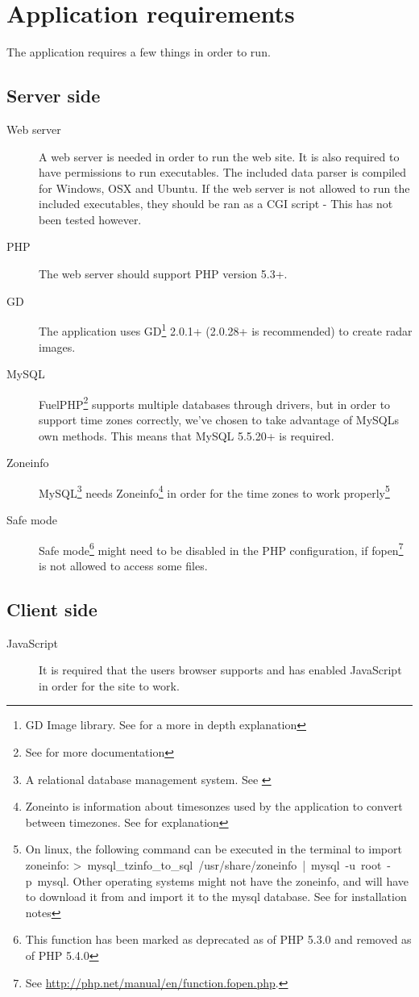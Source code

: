 \chapter{Application requirements}
\label{sec:application_requirements}
The application requires a few things in order to run.

\section{Server side}
\begin{description}
\item[Web server] A web server is needed in order to run the web site. It is also required to have permissions to run executables. The included data parser is compiled for Windows, OSX and Ubuntu. If the web server is not allowed to run the included executables, they should be ran as a CGI script - This has not been tested however.
\item[PHP] The web server should support PHP version 5.3+.
\item[GD] The application uses GD\footnote{GD Image library. See \cite{GD} for a more in depth explanation} 2.0.1+ (2.0.28+ is recommended) to create radar images.
\item[MySQL] FuelPHP\footnote{See \cite{FuelPHP} for more documentation} supports multiple databases through drivers, but in order to support time zones correctly, we've chosen to take advantage of MySQLs own methods. This means that MySQL 5.5.20+ is required.
\item[Zoneinfo] MySQL\footnote{A relational database management system. See \cite{MySQL}} needs Zoneinfo\footnote{Zoneinto is information about timesonzes used by the application to convert between timezones. See \cite{Zoneinfo} for explanation} in order for the time zones to work properly\footnote{On linux, the following command can be executed in the terminal to import zoneinfo: \mbox{\textsf{> mysql\_tzinfo\_to\_sql /usr/share/zoneinfo | mysql -u root -p mysql}}. Other operating systems might not have the zoneinfo, and will have to download it from \cite{Zoneinfo_download} and import it to the mysql database. See \cite{Zoneinfo_install} for installation notes}
\item[Safe mode] Safe mode\footnote{This function has been marked as deprecated as of PHP 5.3.0 and removed as of PHP 5.4.0} might need to be disabled in the PHP configuration, if \textsf{fopen}\footnote{See \url{http://php.net/manual/en/function.fopen.php}.} is not allowed to access some files.
\end{description}

\section{Client side}
\begin{description}
\item[JavaScript] It is required that the users browser supports and has enabled JavaScript in order for the site to work.
\end{description}